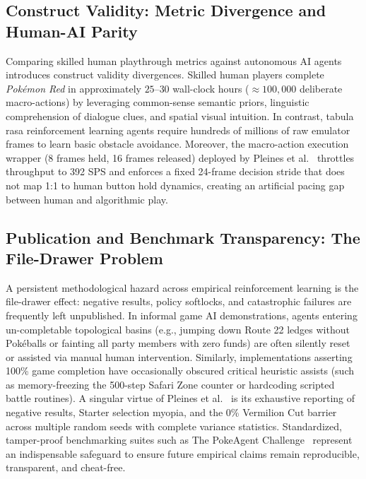 \documentclass[journal,10pt,twocolumn]{IEEEtran}
\begin{document}
\subsection{Construct Validity: Metric Divergence and Human-AI Parity}
Comparing skilled human playthrough metrics against autonomous AI agents introduces construct validity divergences. Skilled human players complete \textit{Pok{\'e}mon Red} in approximately $25$--$30$ wall-clock hours ($\approx 100{,}000$ deliberate macro-actions) by leveraging common-sense semantic priors, linguistic comprehension of dialogue clues, and spatial visual intuition. In contrast, tabula rasa reinforcement learning agents require hundreds of millions of raw emulator frames to learn basic obstacle avoidance. Moreover, the macro-action execution wrapper (8 frames held, 16 frames released) deployed by Pleines et al.~\cite{pleines2025pokemon} throttles throughput to 392 SPS and enforces a fixed 24-frame decision stride that does not map 1:1 to human button hold dynamics, creating an artificial pacing gap between human and algorithmic play.

\subsection{Publication and Benchmark Transparency: The File-Drawer Problem}
A persistent methodological hazard across empirical reinforcement learning is the file-drawer effect: negative results, policy softlocks, and catastrophic failures are frequently left unpublished. In informal game AI demonstrations, agents entering un-completable topological basins (e.g., jumping down Route 22 ledges without Pok{\'e}balls or fainting all party members with zero funds) are often silently reset or assisted via manual human intervention. Similarly, implementations asserting 100\% game completion have occasionally obscured critical heuristic assists (such as memory-freezing the 500-step Safari Zone counter or hardcoding scripted battle routines). A singular virtue of Pleines et al.~\cite{pleines2025pokemon} is its exhaustive reporting of negative results, Starter selection myopia, and the 0\% Vermilion Cut barrier across multiple random seeds with complete variance statistics. Standardized, tamper-proof benchmarking suites such as The PokeAgent Challenge~\cite{karten2026pokeagent} represent an indispensable safeguard to ensure future empirical claims remain reproducible, transparent, and cheat-free.
\end{document}
